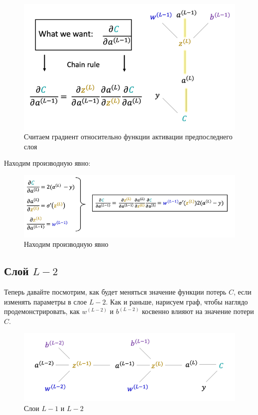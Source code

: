 \documentclass[a4paper, 10pt, openany]{book} %
\begin{document}
	\begin{figure}[h!]
		\centering
		\includegraphics[width=\linewidth]{pictures/backpropagation/last_activation.png}
		\caption{Считаем градиент относительно функции активации предпоследнего слоя}
		\label{last_activation}
	\end{figure}
	
	Находим производную явно:
	
	\begin{figure}[h!]
		\centering
		\includegraphics[width=\linewidth]{pictures/backpropagation/last_activation_itself.png}
		\caption{Находим производную явно}
		\label{last_activation_itself}
	\end{figure}
	
	\subsection{Слой $L-2$}
	
	Теперь давайте посмотрим, как будет меняться значение функции потерь $C$, если изменять параметры в слое $L-2$. Как и раньше, нарисуем граф, чтобы наглядо продемонстрировать, как $w^{(L-2)}$ и $b^{(L-2)}$ косвенно влияют на значение потери $C$.
	
	\begin{figure}[h!]
		\centering
		\includegraphics[width=\linewidth]{pictures/backpropagation/first_layer.png}
		\caption{Слои $L-1$ и $L-2$}
		\label{first_layer}
	\end{figure}
	
\end{document}
